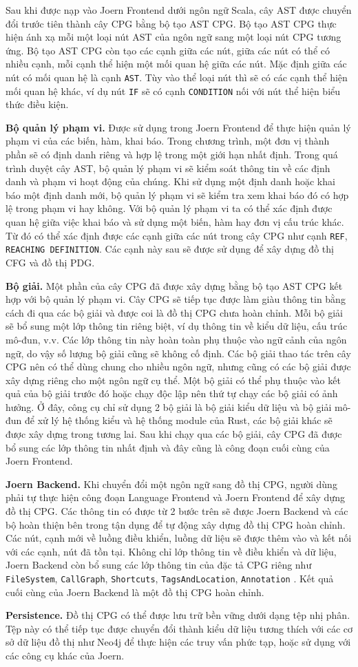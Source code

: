 Sau khi được nạp vào Joern Frontend dưới ngôn ngữ Scala, cây AST được chuyển đổi trước tiên thành cây CPG bằng bộ tạo AST CPG.
Bộ tạo AST CPG thực hiện ánh xạ mỗi một loại nút AST của ngôn ngữ sang một loại nút CPG tương ứng.
Bộ tạo AST CPG còn tạo các cạnh giữa các nút, giữa các nút có thể có nhiều cạnh, mỗi cạnh thể hiện một mối quan hệ giữa các nút.
Mặc định giữa các nút có mối quan hệ là cạnh \texttt{AST}.
Tùy vào thể loại nút thì sẽ có các cạnh thể hiện mối quan hệ khác, ví dụ nút \texttt{IF} sẽ có cạnh \texttt{CONDITION} nối với nút thể hiện biểu thức điều kiện.

\textbf{Bộ quản lý phạm vi.} Được sử dụng trong Joern Frontend để thực hiện quản lý phạm vi của các biến, hàm, khai báo.
Trong chương trình, một đơn vị thành phần sẽ có định danh riêng và hợp lệ trong một giới hạn nhất định.
Trong quá trình duyệt cây AST, bộ quản lý phạm vi sẽ kiểm soát thông tin về các định danh và phạm vi hoạt động của chúng.
Khi sử dụng một định danh hoặc khai báo một định danh mới, bộ quản lý phạm vi sẽ kiểm tra xem khai báo đó có hợp lệ trong phạm vi hay không.
Với bộ quản lý phạm vi ta có thể xác định được quan hệ giữa việc khai báo và sử dụng một biến, hàm hay đơn vị cấu trúc khác.
Từ đó có thể xác định được các cạnh giữa các nút trong cây CPG như cạnh \texttt{REF}, \texttt{REACHING DEFINITION}.
Các cạnh này sau sẽ được sử dụng để xây dựng đồ thị CFG và đồ thị PDG.

\textbf{Bộ giải.} Một phần của cây CPG đã được xây dựng bằng bộ tạo AST CPG kết hợp với bộ quản lý phạm vi.
Cây CPG sẽ tiếp tục được làm giàu thông tin bằng cách đi qua các bộ giải và được coi là đồ thị CPG chưa hoàn chỉnh.
Mỗi bộ giải sẽ bổ sung một lớp thông tin riêng biệt, ví dụ thông tin về kiểu dữ liệu, cấu trúc mô-đun, v.v.
Các lớp thông tin này hoàn toàn phụ thuộc vào ngữ cảnh của ngôn ngữ, do vậy số lượng bộ giải cũng sẽ không cố định.
Các bộ giải thao tác trên cây CPG nên có thể dùng chung cho nhiều ngôn ngữ, nhưng cũng có các bộ giải được xây dựng riêng cho một ngôn ngữ cụ thể.
Một bộ giải có thể phụ thuộc vào kết quả của bộ giải trước đó hoặc chạy độc lập nên thứ tự chạy các bộ giải có ảnh hưởng.
Ở đây, công cụ chỉ sử dụng 2 bộ giải là bộ giải kiểu dữ liệu và bộ giải mô-đun để xử lý hệ thống kiểu và hệ thống module của Rust, các bộ giải khác sẽ được xây dựng trong tương lai.
Sau khi chạy qua các bộ giải, cây CPG đã được bổ sung các lớp thông tin nhất định và đây cũng là công đoạn cuối cùng của Joern Frontend.

\textbf{Joern Backend.} Khi chuyển đổi một ngôn ngữ sang đồ thị CPG, người dùng phải tự thực hiện công đoạn Language Frontend và Joern Frontend để xây dựng đồ thị CPG.
Các thông tin có được từ 2 bước trên sẽ được Joern Backend và các bộ hoàn thiện bên trong tận dụng để tự động xây dựng đồ thị CPG hoàn chỉnh.
Các nút, cạnh mới về luồng điều khiển, luồng dữ liệu sẽ được thêm vào và kết nối với các cạnh, nút đã tồn tại.
Không chỉ lớp thông tin về điều khiển và dữ liệu, Joern Backend còn bổ sung các lớp thông tin của đặc tả CPG riêng như \texttt{FileSystem}, \texttt{CallGraph}, \texttt{Shortcuts}, \texttt{TagsAndLocation}, \texttt{Annotation} \cite{joernCodeProperty}.
Kết quả cuối cùng của Joern Backend là một đồ thị CPG hoàn chỉnh.

\textbf{Persistence.} Đồ thị CPG có thể được lưu trữ bền vững dưới dạng tệp nhị phân.
Tệp này có thể tiếp tục được chuyển đổi thành kiểu dữ liệu tương thích với các cơ sở dữ liệu đồ thị như Neo4j để thực hiện các truy vấn phức tạp, hoặc sử dụng với các công cụ khác của Joern.
